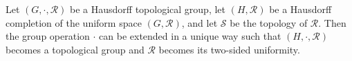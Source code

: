 Let $(G, \cdot, \mathcal{R})$ be a Hausdorff topological group, let $(H, \mathcal{R})$ be a Hausdorff completion of the uniform space $(G, \mathcal{R})$, and let $\mathcal{S}$ be the topology of $\mathcal{R}$. Then the group operation $\cdot$ can be extended in a unique way such that $(H, \cdot, \mathcal{R})$ becomes a topological group and $\mathcal{R}$ becomes its two-sided uniformity.
